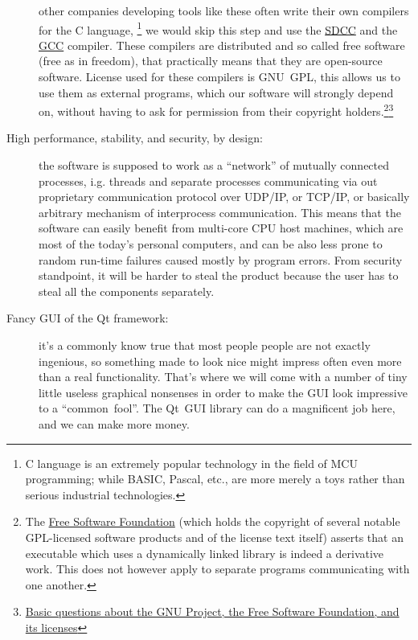 \documentclass[a4paper,twoside,15pt]{book}
\begin{document}
\begin{description}
                    other companies developing tools like these often write their own compilers for the C language, \footnote{C language is an extremely popular technology in the field of MCU programming; while BASIC, Pascal, etc., are more merely a toys rather than serious industrial technologies.} we would skip this step and use the \href{http://en.wikipedia.org/wiki/Small_Device_C_Compiler}{SDCC} and the \href{http://en.wikipedia.org/wiki/GNU_Compiler_Collection}{GCC} compiler. These compilers are distributed and so called free software (free as in freedom), that practically means that they are open-source software. License used for these compilers is GNU~GPL, this allows us to use them as external programs, which our software will strongly depend on, without having to ask for permission from their copyright holders.\footnote{The \href{http://en.wikipedia.org/wiki/Free_Software_Foundation}{Free Software Foundation} (which holds the copyright of several notable GPL-licensed software products and of the license text itself) asserts that an executable which uses a dynamically linked library is indeed a derivative work. This does not however apply to separate programs communicating with one another.}\footnote{\href{http://www.gnu.org/licenses/gpl-faq.html\#NFUseGPLPlugins}{Basic questions about the GNU Project, the Free Software Foundation, and its licenses}}
                \item[High performance, stability, and security, by design:]
                    the software is supposed to work as a ``network'' of mutually connected processes, i.g. threads and separate processes communicating via out proprietary communication protocol over UDP/IP, or TCP/IP, or basically arbitrary mechanism of interprocess communication. This means that the software can easily benefit from multi-core CPU host machines, which are most of the today's personal computers, and can be also less prone to random run-time failures caused mostly by program errors. From security standpoint, it will be harder to steal the product because the user has to steal all the components separately.
                \item[Fancy GUI of the Qt framework:]
                    it's a commonly know true that most people people are not exactly ingenious, so something made to look nice might impress often even more than a real functionality. That's where we will come with a number of tiny little useless graphical nonsenses in order to make the GUI look impressive to a ``common~fool''. The Qt~GUI library can do a magnificent job here, and we can make more money.

\end{description}
\end{document}

